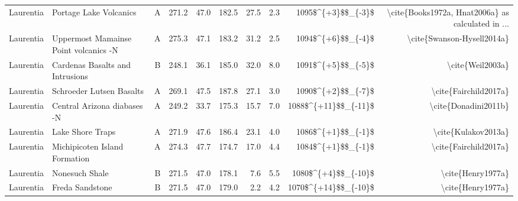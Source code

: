 \begin{longtable}{p{1 in}p{1 in}rrrrrrrr}
                     Laurentia &                             Portage Lake Volcanics &      A &     271.2 &      47.0 & 182.5 &  27.5 &       2.3 &     1095\$\textasciicircum \{+3\}\$\$\_\{-3\}\$ &  \textbackslash cite\{Books1972a, Hnat2006a\} as calculated in ... \\
                     Laurentia &              Uppermost Mamainse Point volcanics -N &      A &     275.3 &      47.1 & 183.2 &  31.2 &       2.5 &     1094\$\textasciicircum \{+6\}\$\$\_\{-4\}\$ &                         \textbackslash cite\{Swanson-Hysell2014a\} \\
                     Laurentia &                    Cardenas Basalts and Intrusions &      B &     248.1 &      36.1 & 185.0 &  32.0 &       8.0 &     1091\$\textasciicircum \{+5\}\$\$\_\{-5\}\$ &                                   \textbackslash cite\{Weil2003a\} \\
                     Laurentia &                           Schroeder Lutsen Basalts &      A &     269.1 &      47.5 & 187.8 &  27.1 &       3.0 &     1090\$\textasciicircum \{+2\}\$\$\_\{-7\}\$ &                              \textbackslash cite\{Fairchild2017a\} \\
                     Laurentia &                        Central Arizona diabases -N &      A &     249.2 &      33.7 & 175.3 &  15.7 &       7.0 &   1088\$\textasciicircum \{+11\}\$\$\_\{-11\}\$ &                               \textbackslash cite\{Donadini2011b\} \\
                     Laurentia &                                   Lake Shore Traps &      A &     271.9 &      47.6 & 186.4 &  23.1 &       4.0 &     1086\$\textasciicircum \{+1\}\$\$\_\{-1\}\$ &                                \textbackslash cite\{Kulakov2013a\} \\
                     Laurentia &                      Michipicoten Island Formation &      A &     274.3 &      47.7 & 174.7 &  17.0 &       4.4 &     1084\$\textasciicircum \{+1\}\$\$\_\{-1\}\$ &                              \textbackslash cite\{Fairchild2017a\} \\
                     Laurentia &                                     Nonesuch Shale &      B &     271.5 &      47.0 & 178.1 &   7.6 &       5.5 &    1080\$\textasciicircum \{+4\}\$\$\_\{-10\}\$ &                                  \textbackslash cite\{Henry1977a\} \\
                     Laurentia &                                    Freda Sandstone &      B &     271.5 &      47.0 & 179.0 &   2.2 &       4.2 &   1070\$\textasciicircum \{+14\}\$\$\_\{-10\}\$ &                                  \textbackslash cite\{Henry1977a\} \\

\end{longtable}
